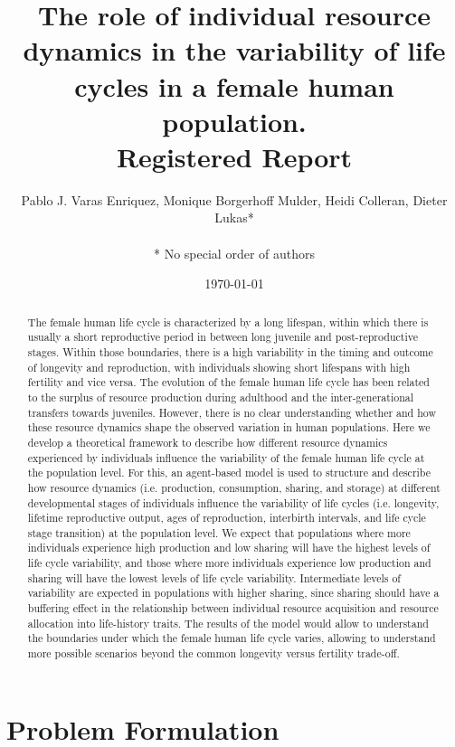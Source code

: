 \documentclass{article}
\title{The role of individual resource dynamics in the variability of life cycles in a female human population.
\\
Registered Report}
\author{Pablo J. Varas Enriquez, Monique Borgerhoff Mulder, Heidi Colleran, Dieter Lukas*\\\\
* No special order of authors}
\date{\today}
\begin{document}
\maketitle

\tableofcontents

\begin{abstract}
    The female human life cycle is characterized by a long lifespan, within which there is usually a short reproductive period in between long juvenile and post-reproductive stages. Within those boundaries, there is a high variability in the timing and outcome of longevity and reproduction, with individuals showing short lifespans with high fertility and vice versa. The evolution of the female human life cycle has been related to the surplus of resource production during adulthood and the inter-generational transfers towards juveniles. However, there is no clear understanding whether and how these resource dynamics shape the observed variation in human populations. Here we develop a theoretical framework to describe how different resource dynamics experienced by individuals influence the variability of the female human life cycle at the population level. For this, an agent-based model is used to structure and describe how resource dynamics (i.e. production, consumption, sharing, and storage) at different developmental stages of individuals influence the variability of life cycles (i.e. longevity, lifetime reproductive output, ages of reproduction, interbirth intervals, and life cycle stage transition) at the population level. We expect that populations where more individuals experience high production and low sharing will have the highest levels of life cycle variability, and those where more individuals experience low production and sharing will have the lowest levels of life cycle variability. Intermediate levels of variability are expected in populations with higher sharing, since sharing should have a buffering effect in the relationship between individual resource acquisition and resource allocation into life-history traits. The results of the model would allow to understand the boundaries under which the female human life cycle varies, allowing to understand more possible scenarios beyond the common longevity versus fertility trade-off. 
\end{abstract}

\section{Problem Formulation}
\end{document}
